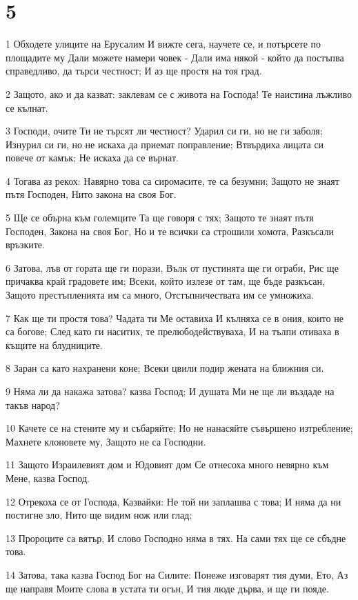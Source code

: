 \chapter{5}

\par 1 Обходете улиците на Ерусалим И вижте сега, научете се, и потърсете по площадите му Дали можете намери човек - Дали има някой - който да постъпва справедливо, да търси честност; И аз ще простя на тоя град.
\par 2 Защото, ако и да казват: заклевам се с живота на Господа! Те наистина лъжливо се кълнат.
\par 3 Господи, очите Ти не търсят ли честност? Ударил си ги, но не ги заболя; Изнурил си ги, но не искаха да приемат поправление; Втвърдиха лицата си повече от камък; Не искаха да се върнат.
\par 4 Тогава аз рекох: Навярно това са сиромасите, те са безумни; Защото не знаят пътя Господен, Нито закона на своя Бог.
\par 5 Ще се обърна към големците Та ще говоря с тях; Защото те знаят пътя Господен, Закона на своя Бог, Но и те всички са строшили хомота, Разкъсали връзките.
\par 6 Затова, лъв от гората ще ги порази, Вълк от пустинята ще ги ограби, Рис ще причаква край градовете им; Всеки, който излезе от там, ще бъде разкъсан, Защото престъпленията им са много, Отстъпничествата им се умножиха.
\par 7 Как ще ти простя това? Чадата ти Ме оставиха И кълняха се в ония, които не са богове; След като ги наситих, те прелюбодействуваха, И на тълпи отиваха в къщите на блудниците.
\par 8 Заран са като нахранени коне; Всеки цвили подир жената на ближния си.
\par 9 Няма ли да накажа затова? казва Господ; И душата Ми не ще ли въздаде на такъв народ?
\par 10 Качете се на стените му и събаряйте; Но не нанасяйте съвършено изтребление; Махнете клоновете му, Защото не са Господни.
\par 11 Защото Израилевият дом и Юдовият дом Се отнесоха много невярно към Мене, казва Господ.
\par 12 Отрекоха се от Господа, Казвайки: Не той ни заплашва с това; И няма да ни постигне зло, Нито ще видим нож или глад;
\par 13 Пророците са вятър, И слово Господно няма в тях. На сами тях ще се сбъдне това.
\par 14 Затова, така казва Господ Бог на Силите: Понеже изговарят тия думи, Ето, Аз ще направя Моите слова в устата ти огън, И тия люде дърва, и ще ги пояде.
